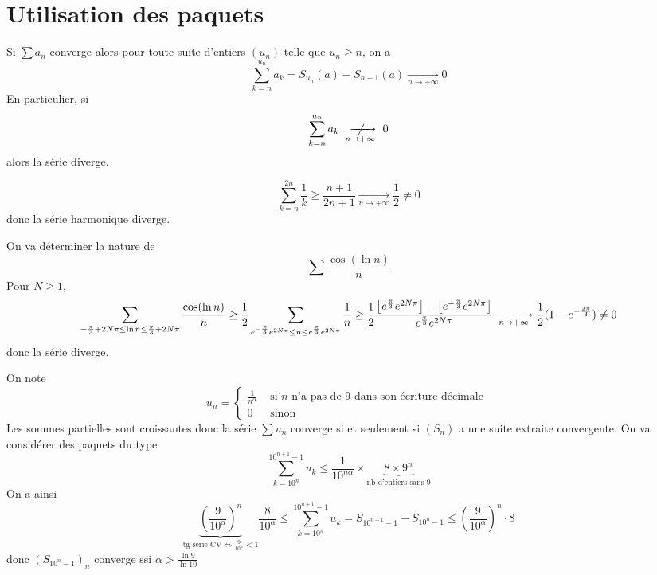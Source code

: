 \section{Utilisation des paquets}

\begin{rem}
    Si $\sum a_n$ converge alors pour toute suite d'entiers $(u_n)$ telle que $u_n\geq n$, on a \[
        \sum_{k=n}^{u_n}a_k=S_{u_n}(a)-S_{n-1}(a)\xrightarrow[n\to+\infty]{}0
    \]
    En particulier,  si \[
        \sum_{k=n}^{u_n}a_k\xnrightarrow[n\to+\infty]{}0
    \]
    alors la série diverge.
\end{rem}

\begin{ex}
    \[
        \sum_{k=n}^{2n}\frac1k\geq \frac{n+1}{2n+1}\xrightarrow[n\to+\infty]{}\frac12\neq 0
    \]
    donc la série harmonique diverge.
\end{ex}

\begin{ex}
    On va déterminer la nature de \[
        \sum\frac{\cos (\ln n)}n
    \]
    Pour $N\geq 1$, \[
        \sum_{-\frac\pi3+2N\pi\leq \ln n\leq \frac\pi3+2N\pi}\frac{\cos(\ln n)}n \geq \frac12\sum_{e^{-\frac\pi3}e^{2N\pi}\leq n\leq e^{\frac\pi3}e^{2N\pi}}\frac1n\geq \frac12\frac{\left\lfloor e^{\frac\pi3}e^{2N\pi}\right\rfloor-\left\lfloor e^{-\frac\pi3}e^{2N\pi}\right\rfloor}{e^{\frac\pi3}e^{2N\pi}}\xrightarrow[n\to+\infty]{}\frac12(1-e^{-\frac{2\pi}3})\neq 0
    \]
    donc la série diverge.
\end{ex}

\begin{ex}
    On note \[
        u_n=\begin{cases}\frac1{n^\alpha}&\text{ si $n$ n'a pas de $9$ dans son écriture décimale }\\ 0 & \text{ sinon }\end{cases}
    \]
    Les sommes partielles sont croissantes donc la série $\sum u_n$ converge si et seulement si $(S_n)$ a une suite extraite convergente.
    On va considérer des paquets du type \[
        \sum_{k=10^n}^{10^{n+1}-1}u_k\leq \frac1{10^{n\alpha}}\times \underbrace{8\times 9^n}_{\text{nb d'entiers sans }9}
    \]
    On a ainsi \[
        \underbrace{\left( \frac9{10^\alpha} \right)^n}_{\text{tg série CV} \iff \frac9{10^\alpha}<1}\frac8{10^\alpha}\leq \sum_{k=10^n}^{10^{n+1}-1}u_k=S_{10^{n+1}-1}-S_{10^n-1}\leq \left( \frac9{10^\alpha} \right)^n\cdot 8
    \]
    donc $(S_{10^n-1})_n$ converge ssi $\displaystyle \alpha>\frac{\ln 9}{\ln 10}$
\end{ex}

